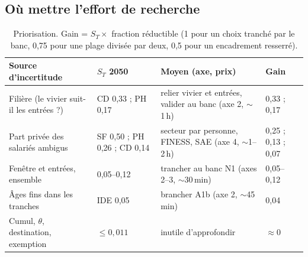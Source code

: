\subsection{Où mettre l'effort de recherche}
\begin{table}[h]\centering\small
\begin{tabular}{p{4cm}p{3.1cm}p{4.5cm}p{2.2cm}}
\toprule
Source d'incertitude & $S_T$ 2050 & Moyen (axe, prix\suppose{}) & Gain\derive{} \\
\midrule
Filière (le vivier suit-il les entrées ?) & CD 0,33 ; PH 0,17\mesure{} & relier vivier et entrées, valider au banc (axe 2, $\sim$1\,h) & 0,33 ; 0,17 \\
Part privée des salariés ambigus & SF 0,50 ; PH 0,26 ; CD 0,14\mesure{} & secteur par personne, FINESS, SAE (axe 4, $\sim$1--2\,h) & 0,25 ; 0,13 ; 0,07 \\
Fenêtre et entrées, ensemble & 0,05--0,12\mesure{} & trancher au banc N1 (axes 2--3, $\sim$30\,min) & 0,05--0,12 \\
Âges fins dans les tranches & IDE 0,05\mesure{} & brancher A1b (axe 2, $\sim$45\,min) & 0,04 \\
Cumul, $\theta$, destination, exemption & $\le 0{,}011$\mesure{} & inutile d'approfondir & $\approx 0$ \\
\bottomrule
\end{tabular}
\caption{Priorisation. Gain = $S_T \times$ fraction réductible (1 pour un choix tranché par le banc, 0,75 pour une
plage divisée par deux, 0,5 pour un encadrement resserré).}\label{a5-tab:prio}
\end{table}

